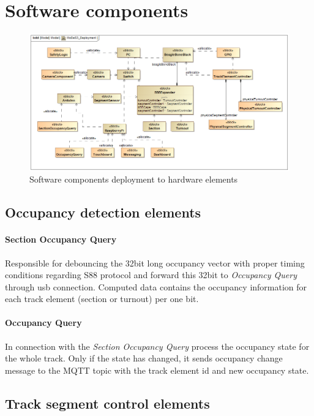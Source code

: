 \section{Software components}\label{section:CustomSW}
\begin{figure}[h]
	\centering
	\includegraphics[width=150mm]{figures/modes3/MoDeS3_Deployment1.png}
	\caption{Software components deployment to hardware elements}
	\label{fig:Modes3Deployment}
\end{figure}

\subsection{Occupancy detection elements} \label{section:OccupancyDetection}
\paragraph{Section Occupancy Query}
Responsible for debouncing the 32bit long occupancy vector with proper timing conditions regarding S88 protocol and forward this 32bit to \textit{Occupancy Query} through usb connection. Computed data contains the occupancy information for each track element (section or turnout) per one bit.
\paragraph{Occupancy Query}
In connection with the \textit{Section Occupancy Query} process the occupancy state for the whole track. Only if the state has changed, it sends occupancy change message to the MQTT topic with the track element id and new occupancy state.

\subsection{Track segment control elements}
